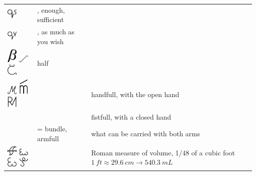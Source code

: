 \documentclass[british,final,landscape]{scrartcl}
\begin{document}
\begin{refsection}
\begin{supertabular}{p{0.3\textwidth}p{0.34\textwidth}p{0.34\textwidth}}
   \includegraphics[width=5mm]{Measures/QuantumSatis} & , enough, sufficient & \\
   \includegraphics[width=5mm]{Measures/QuantumVis} & , as much as you wish & \\
   \includegraphics[width=5mm]{Measures/Half} \includegraphics[width=5mm]{Measures/Half2} \includegraphics[width=5mm]{Measures/Half3} & half & \\
   \includegraphics[width=5mm]{Measures/Handfull} \includegraphics[width=5mm]{Measures/Manipule} \includegraphics[width=5mm]{Measures/Manipule2} &  & handfull, with the open hand \\
   &  & fistfull, with a closed hand \\
   &  = bundle, armfull  & what can be carried with both arms \\
   \includegraphics[width=5mm]{Measures/Sextarius}  \includegraphics[width=5mm]{Measures/Sextarius2} \includegraphics[width=5mm]{Measures/Sextarius3} \includegraphics[width=5mm]{Measures/Sextarius4}  &  & Roman measure of volume, 1/48 of a cubic foot \(\SI{1}{ft} \approx \SI{29.6}{cm} \rightarrow \SI{540.3}{mL}\) \\

\end{supertabular}
\end{refsection}
\end{document}
